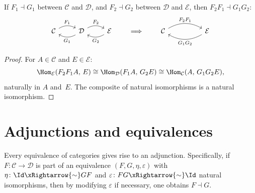 \begin{proposition}\label{prop:adj-compose}
If $F_1\dashv G_1$ between $\mathcal{C}$ and $\mathcal{D}$,
and $F_2\dashv G_2$ between $\mathcal{D}$ and $\mathcal{E}$, then
$F_2 F_1 \dashv G_1 G_2$:
\[
\begin{tikzcd}
\mathcal{C}
  \arrow[r, bend left, "F_1"]
& \mathcal{D}
  \arrow[l, bend left, "G_1"]
  \arrow[r, bend left, "F_2"]
& \mathcal{E}
  \arrow[l, bend left, "G_2"]
\end{tikzcd}
\qquad\Longrightarrow\qquad
\begin{tikzcd}
\mathcal{C}
  \arrow[rr, bend left, "F_2 F_1"]
& &
\mathcal{E}
  \arrow[ll, bend left, "G_1 G_2"]
\end{tikzcd}
\]
\end{proposition}

\begin{proof}
For $A\in\mathcal{C}$ and $E\in\mathcal{E}$:
\[
    \Hom_\mathcal{E}(F_2 F_1 A,\, E)
    \cong \Hom_\mathcal{D}(F_1 A,\, G_2 E)
    \cong \Hom_\mathcal{C}(A,\, G_1 G_2 E),
\]
naturally in $A$ and~$E$.  The composite of natural isomorphisms is
a natural isomorphism.
\end{proof}


\section{Adjunctions and equivalences}\label{sec:adj-equiv}

\begin{proposition}\label{prop:equiv-is-adjunction}
Every equivalence of categories gives rise to an adjunction.
Specifically, if $F\colon\mathcal{C}\to\mathcal{D}$ is part of an
equivalence $(F,G,\eta,\varepsilon)$ with $\eta\colon\Id\xRightarrow{\sim}GF$
and $\varepsilon\colon FG\xRightarrow{\sim}\Id$ natural isomorphisms,
then by modifying $\varepsilon$ if necessary, one obtains $F\dashv G$.
\end{proposition}

